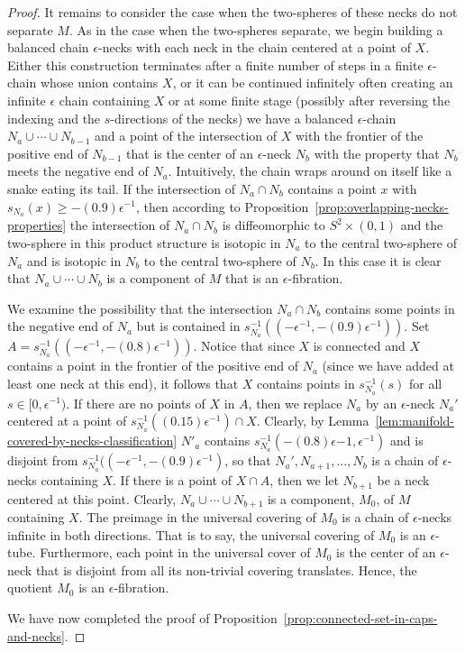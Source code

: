 \begin{proof}
It remains to consider the case when the two-spheres of these necks
do not separate $M$. As in the case when the two-spheres separate,
we begin building a balanced chain $\epsilon$-necks with each neck
in the chain centered at a point of $X$. Either this construction
terminates after a finite number of steps in a finite
$\epsilon$-chain whose union contains $X$, or it can be continued
infinitely often creating an infinite $\epsilon$ chain containing
$X$ or at some finite stage (possibly after reversing the indexing
and the $s$-directions of the necks)  we have a balanced
$\epsilon$-chain $N_a\cup\cdots\cup N_{b-1}$ and a point of the
intersection of $X$ with the frontier of the positive end of
$N_{b-1}$ that is the center of an $\epsilon$-neck $N_b$ with the
property that $N_b$ meets the negative end of $N_a$. Intuitively,
the chain wraps around on itself like a snake eating its tail. If
the intersection of $N_a\cap N_b$ contains a point $x$ with
$s_{N_a}(x)\ge -(0.9)\epsilon^{-1}$, then according to
Proposition~\ref{prop:overlapping-necks-properties} the intersection of $N_a\cap N_b$
is diffeomorphic to $S^2\times (0,1)$ and the two-sphere in this
product structure is isotopic in $N_a$ to the central two-sphere of
$N_a$ and is isotopic in $N_b$ to the central two-sphere of $N_b$.
In this case it is clear that $N_a\cup \cdots \cup N_b$ is a
component of $M$ that is an $\epsilon$-fibration.

We examine the possibility that the intersection $N_a\cap N_b$
contains some points in the negative end of $N_a$ but is  contained
in $s_{N_a}^{-1}((-\epsilon^{-1},-(0.9)\epsilon^{-1}))$. Set $A=
s_{N_a}^{-1}((-\epsilon^{-1},-(0.8)\epsilon^{-1}))$. Notice that
since $X$ is connected and $X$ contains a point in the frontier of
the positive end of $N_a$ (since we have added at least one neck at
this end), it follows that $X$ contains points in $s_{N_a}^{-1}(s)$
for all $s\in [0,\epsilon^{-1})$.
 If there are
no points of $X$ in  $A$, then we replace $N_a$ by an
$\epsilon$-neck $N_a'$ centered at a point of
$s_{N_a}^{-1}\left((0.15)\epsilon^{-1}\right)\cap X$. Clearly, by
Lemma~\ref{lem:manifold-covered-by-necks-classification} $N'_a$ contains
$s_{N_a}^{-1}(-(0.8)\epsilon{-1},\epsilon^{-1})$ and is disjoint
from $s_{N_a}^{-1}((-\epsilon^{-1},-(0.9)\epsilon^{-1})$, so that
$N_a',N_{a+1}, \ldots, N_b$ is a chain of $\epsilon$-necks
containing $X$. If there is a point of $X\cap A$, then we let
$N_{b+1}$ be a neck centered at this point. Clearly,
$N_a\cup\cdots\cup N_{b+1}$ is a component, $M_0$, of $M$ containing
$X$. The preimage in the universal covering of $M_0$ is a chain of
$\epsilon$-necks infinite in both directions. That is to say, the
universal covering of $M_0$ is an $\epsilon$-tube. Furthermore, each
point in the universal cover of $M_0$ is the center of an
$\epsilon$-neck that is disjoint from all its non-trivial covering
translates. Hence, the quotient $M_0$ is an $\epsilon$-fibration.

We have now completed the proof of Proposition~\ref{prop:connected-set-in-caps-and-necks}.
\end{proof}


